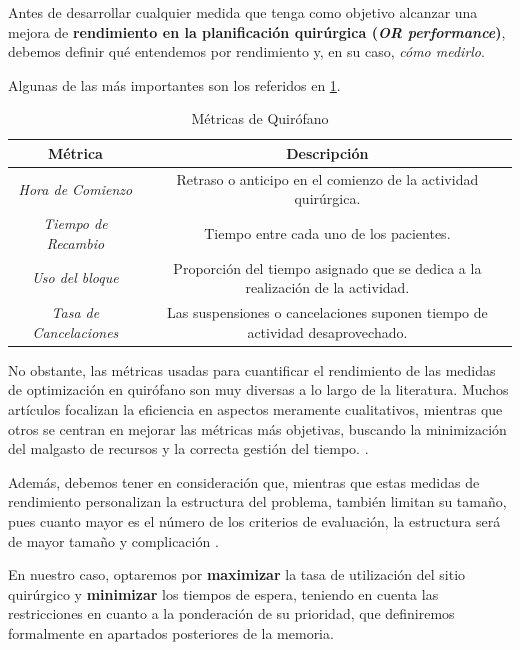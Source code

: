 Antes de desarrollar cualquier medida que tenga como objetivo alcanzar una mejora de \textbf{rendimiento en la planificación quirúrgica (\textit{OR performance})}, debemos definir qué entendemos por rendimiento y, en su caso, \textit{cómo medirlo}. 

Algunas de las más importantes son los referidos en \ref{Métricas de Quirófano}.
\begin{table}[]
    \centering
    \begin{tabular}{c|c}
        \toprule
            \textbf{Métrica}   &  \textbf{Descripción}  \\
         \midrule
              \textit{Hora de Comienzo}  &  Retraso o anticipo en el comienzo de la actividad quirúrgica. \\
              \textit{Tiempo de Recambio }& Tiempo entre cada uno de los pacientes. \\
              \textit{Uso del bloque} & Proporción del tiempo asignado que se dedica a la realización de la actividad. \\
              \textit{Tasa de Cancelaciones} & Las suspensiones o cancelaciones suponen tiempo de actividad desaprovechado. \\
       \bottomrule
    \end{tabular}
    \caption{Métricas de Quirófano}
    \label{Métricas de Quirófano}
\end{table}

No obstante, las métricas usadas para cuantificar el rendimiento de las medidas de optimización en quirófano son muy diversas a lo largo de la literatura.
Muchos artículos focalizan la eficiencia en aspectos meramente cualitativos, mientras que otros se centran en mejorar las métricas más objetivas, buscando la minimización del malgasto de recursos y la correcta gestión del tiempo. \cite{Schouten2023OperatingReview}.

Además, debemos tener en consideración que, mientras que estas medidas de rendimiento personalizan la estructura del problema, también limitan su tamaño, pues cuanto mayor es el número de los criterios de evaluación, la estructura será de mayor tamaño y complicación \cite{Gur2018ApplicationOverview}. 

En nuestro caso, optaremos por \textbf{maximizar} la tasa de utilización del sitio quirúrgico y \textbf{minimizar} los tiempos de espera, teniendo en cuenta las restricciones en cuanto a la ponderación de su prioridad, que definiremos formalmente en apartados posteriores de la memoria. 

